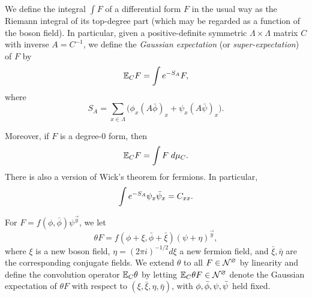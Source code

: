 We define the integral $\int F$ of a differential form $F$ in the usual way
as the Riemann integral of its top-degree part (which may be regarded as a function
of the boson field).
In particular, given a positive-definite symmetric
$\Lambda \times \Lambda$ matrix $C$ with inverse $A = C^{-1}$,
we define the \emph{Gaussian expectation} (or \emph{super-expectation}) of $F$ by
\begin{equation}
\lbeq{ExCF}
\Ex_C F = \int e^{-S_A} F,
\end{equation}
where
\begin{equation}
\label{e:action}
S_A = \sum_{x\in\Lambda} \Big(\phi_x (A\bar\phi)_x + \psi_x (A \bar\psi)_x\Big).
\end{equation}

Moreover, if $F$ is a degree-$0$ form, then
\begin{equation}
\mathbb{E}_C F = \int F \; d\mu_C.
\end{equation}
There is also a version of Wick's theorem for fermions. In particular,
\begin{equation}
\label{e:wick-fermion2}
\int e^{-S_A} \psi_x \bar\psi_x = C_{xx}.
\end{equation}

For $F = f(\phi, \bar\phi) \psi^{\vec y}$, we let
\begin{equation}
\theta F = f(\phi + \xi, \bar\phi + \bar\xi) (\psi + \eta)^{\vec y},
\end{equation}
where $\xi$ is a new boson field, $\eta = (2\pi i)^{-1/2} d\xi$ a new fermion field,
and $\bar\xi, \bar\eta$ are the corresponding conjugate fields.
We extend $\theta$ to all $F \in \mathcal{N}^\varnothing$ by linearity
and define the convolution operator $\mathbb{E}_C\theta$ by letting
$\mathbb{E}_C\theta F \in \mathcal{N}^\varnothing$ denote the Gaussian expectation of $\theta F$ with respect
to $(\xi, \bar\xi, \eta, \bar\eta)$, with $\phi,\bar\phi,\psi,\bar\psi$ held fixed.

